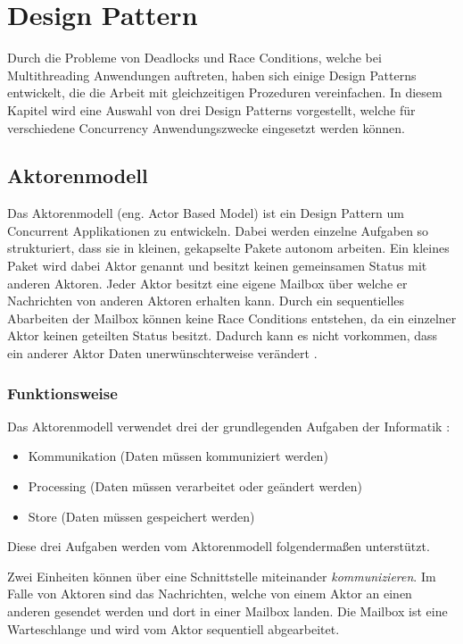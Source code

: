 \section{Design Pattern}

Durch die Probleme von Deadlocks und Race Conditions, welche bei Multithreading Anwendungen auftreten, haben sich einige Design Patterns entwickelt, die die Arbeit mit gleichzeitigen Prozeduren vereinfachen. In diesem Kapitel wird eine Auswahl von drei Design Patterns vorgestellt, welche für verschiedene Concurrency Anwendungszwecke eingesetzt werden können.

\subsection{Aktorenmodell}
\label{section:Actor Based Model}

Das Aktorenmodell (eng. Actor Based Model) ist ein Design Pattern um Concurrent Applikationen zu entwickeln. Dabei werden einzelne Aufgaben so strukturiert, dass sie in kleinen, gekapselte Pakete autonom arbeiten. Ein kleines Paket wird dabei Aktor genannt und besitzt keinen gemeinsamen Status mit anderen Aktoren. Jeder Aktor besitzt eine eigene Mailbox über welche er Nachrichten von anderen Aktoren erhalten kann. Durch ein sequentielles Abarbeiten der Mailbox können keine Race Conditions entstehen, da ein einzelner Aktor keinen geteilten Status besitzt. Dadurch kann es nicht vorkommen, dass ein anderer Aktor Daten unerwünschterweise verändert \cite[p. 84]{Erb2012}. 

\subsubsection{Funktionsweise}

Das Aktorenmodell verwendet drei der grundlegenden Aufgaben der Informatik \cite[p. 85]{Erb2012}:

\begin{itemize}
  \item Kommunikation (Daten müssen kommuniziert werden)
  \item Processing (Daten müssen verarbeitet oder geändert werden)
  \item Store (Daten müssen gespeichert werden)
\end{itemize}

Diese drei Aufgaben werden vom Aktorenmodell folgendermaßen unterstützt.

Zwei Einheiten können über eine Schnittstelle miteinander \emph{kommunizieren}. Im Falle von Aktoren sind das Nachrichten, welche von einem Aktor an einen anderen gesendet werden und dort in einer Mailbox landen. Die Mailbox ist eine Warteschlange und wird vom Aktor sequentiell abgearbeitet. 

